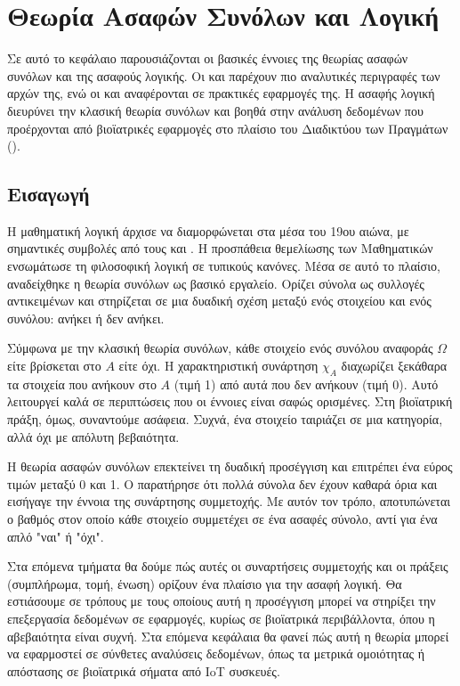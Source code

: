 \chapter{Θεωρία Ασαφών Συνόλων και Λογική}
\label{chap3}
Σε αυτό το κεφάλαιο παρουσιάζονται οι βασικές έννοιες της θεωρίας ασαφών συνόλων και της ασαφούς λογικής.
Οι  και  \cite{KlirYuan} παρέχουν πιο αναλυτικές περιγραφές των αρχών της, ενώ οι  και  \cite{Nguyen} αναφέρονται σε πρακτικές εφαρμογές της. 
Η ασαφής λογική διευρύνει την κλασική θεωρία συνόλων και βοηθά στην ανάλυση δεδομένων που προέρχονται από βιοϊατρικές εφαρμογές στο πλαίσιο του Διαδικτύου των Πραγμάτων ().

\section{Εισαγωγή}

Η μαθηματική λογική άρχισε να διαμορφώνεται στα μέσα του 19ου αιώνα, με σημαντικές συμβολές από τους  και . Η προσπάθεια θεμελίωσης των Μαθηματικών ενσωμάτωσε τη φιλοσοφική λογική σε τυπικούς κανόνες. Μέσα σε αυτό το πλαίσιο, αναδείχθηκε η θεωρία συνόλων ως βασικό εργαλείο. Ορίζει σύνολα ως συλλογές αντικειμένων και στηρίζεται σε μια δυαδική σχέση μεταξύ ενός στοιχείου και ενός συνόλου: ανήκει ή δεν ανήκει.

Σύμφωνα με την κλασική θεωρία συνόλων, κάθε στοιχείο ενός συνόλου αναφοράς \(\Omega\) είτε βρίσκεται στο \(A\) είτε όχι. Η χαρακτηριστική συνάρτηση \(\chi_A\) διαχωρίζει ξεκάθαρα τα στοιχεία που ανήκουν στο \(A\) (τιμή 1) από αυτά που δεν ανήκουν (τιμή 0). Αυτό λειτουργεί καλά σε περιπτώσεις που οι έννοιες είναι σαφώς ορισμένες. Στη βιοϊατρική πράξη, όμως, συναντούμε ασάφεια. Συχνά, ένα στοιχείο ταιριάζει σε μια κατηγορία, αλλά όχι με απόλυτη βεβαιότητα.

Η θεωρία ασαφών συνόλων επεκτείνει τη δυαδική προσέγγιση και επιτρέπει ένα εύρος τιμών μεταξύ 0 και 1. Ο  \cite{Zadeh1965} παρατήρησε ότι πολλά σύνολα δεν έχουν καθαρά όρια και εισήγαγε την έννοια της συνάρτησης συμμετοχής. Με αυτόν τον τρόπο, αποτυπώνεται ο βαθμός στον οποίο κάθε στοιχείο συμμετέχει σε ένα ασαφές σύνολο, αντί για ένα απλό "ναι" ή "όχι".

Στα επόμενα τμήματα θα δούμε πώς αυτές οι συναρτήσεις συμμετοχής και οι πράξεις (συμπλήρωμα, τομή, ένωση) ορίζουν ένα πλαίσιο για την ασαφή λογική. Θα εστιάσουμε σε τρόπους με τους οποίους αυτή η προσέγγιση μπορεί να στηρίξει την επεξεργασία δεδομένων σε  εφαρμογές, κυρίως σε βιοϊατρικά περιβάλλοντα, όπου η αβεβαιότητα είναι συχνή.
Στα επόμενα κεφάλαια θα φανεί πώς αυτή η θεωρία μπορεί να εφαρμοστεί σε σύνθετες αναλύσεις δεδομένων, όπως τα μετρικά ομοιότητας ή απόστασης σε βιοϊατρικά σήματα από IoT συσκευές.

